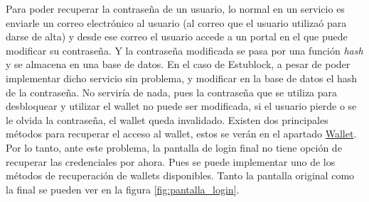 Para poder recuperar la contraseña de un usuario, lo normal en un servicio es enviarle un correo electrónico al usuario (al correo que el usuario utilizaó para darse de alta) y desde ese correo el usuario accede a un portal en el que puede modificar su contraseña. Y la contraseña modificada se pasa por una función \textit{hash}\cite{whatIsHash} y se almacena en una base de datos. En el caso de Estublock, a pesar de poder implementar dicho servicio sin problema, y modificar en la base de datos el hash de la contraseña. No serviría de nada, pues la contraseña que se utiliza para desbloquear y utilizar el wallet no puede ser modificada, si el usuario pierde o se le olvida la contraseña, el wallet queda invalidado. Existen dos principales métodos para recuperar el acceso al wallet, estos se verán en el apartado \hyperref[sec:wallet]{Wallet}. Por lo tanto, ante este problema, la pantalla de login final no tiene opción de recuperar las credenciales por ahora. Pues se puede implementar uno de los métodos de recuperación de wallets disponibles. Tanto la pantalla original como la final se pueden ver en la figura \ref{fig:pantalla_login}. \\

